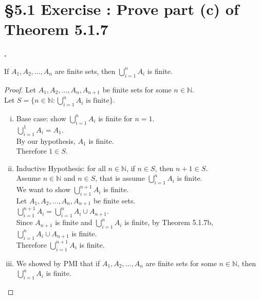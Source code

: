 \documentclass[a4paper,11pt]{article}
\begin{document}
\section*{\S 5.1 Exercise : Prove part {(c)} of Theorem 5.1.7}
\setcounter{SubsectionCounter}{3}
\textbf{.}
\begin{theorem1}
If \(A_{1},A_{2},\ldots,A_{n}\) are finite sets, then \(\bigcup\limits_{i=1}^{n}A_{i}\) 
is finite.
  \begin{proof}
  Let \(A_{1},A_{2},\ldots,A_{n},A_{n+1}\) be finite sets for some \(n \in 
  \mathbb{N}\).\\
  Let \(S = \{n \in \mathbb{N}: \bigcup\limits_{i=1}^{n}A_{i} \text{ is 
    finite}\}\).
    \begin{enumerate}[(i)]
      \item Base case: show \(\bigcup\limits_{i=1}^{n}A_{i}\) is finite for 
      \(n=1\).\\
      \(\bigcup\limits_{i=1}^{1}A_{i} = A_1\).\\
      By our hypothesis, \(A_{1}\) is finite.\\
      Therefore \(1 \in S\).
      \item Inductive Hypothesis: for all \(n \in \mathbb{N}\), if \(n \in S\), 
      then \(n+1 \in S\).\\
      Assume \(n \in \mathbb{N}\) and \(n \in S\), that is assume \(\bigcup\limits_{i=1}^{n}A_{i}\) 
      is finite.\\
      We want to show \(\bigcup\limits_{i=1}^{n+1}A_{i}\) is finite.\\
      Let \(A_{1},A_{2},\ldots,A_{n},A_{n+1}\) be finite sets.\\
      \(\bigcup\limits_{i=1}^{n+1}A_{i} = \bigcup\limits_{i=1}^{n}A_{i} \cup 
      A_{n+1}\).\\
      Since \(A_{n+1}\) is finite and \(\bigcup\limits_{i=1}^{n}A_{i}\) is 
      finite, by Theorem 5.1.7b, \(\bigcup\limits_{i=1}^{n}A_{i} \cup 
      A_{n+1}\) is finite.\\
      Therefore \(\bigcup\limits_{i=1}^{n+1}A_{i}\) is finite.
      \item We showed by PMI that if \(A_{1},A_{2},\ldots,A_{n}\) are finite sets for some \(n \in 
      \mathbb{N}\), then \(\bigcup\limits_{i=1}^{n}A_{i}\) 
is finite.
    \end{enumerate}
  \end{proof}
\end{theorem1}
\newpage
\setcounter{ProblemCounter}{13}
\end{document}
